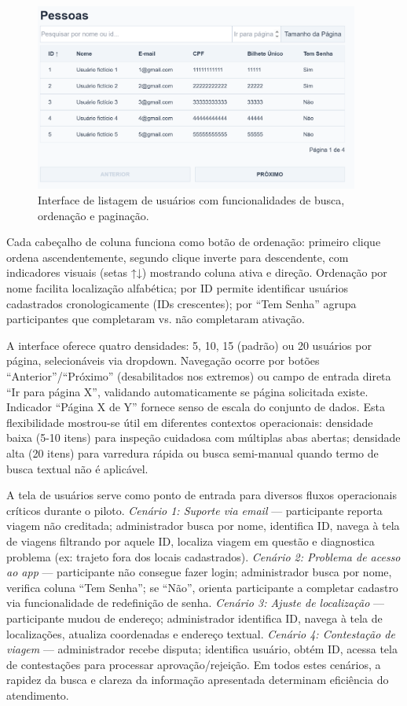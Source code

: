 \begin{figure}[H]
    \centering
    \includegraphics[width=0.95\textwidth]{figuras/pessoas.PNG}
    \caption{Interface de listagem de usuários com funcionalidades de busca, ordenação e paginação.}
    \label{fig:usuarios_listagem}
  \end{figure}

Cada cabeçalho de coluna funciona como botão de
ordenação: primeiro clique ordena ascendentemente, segundo clique inverte para
descendente, com indicadores visuais (setas ↑↓) mostrando coluna ativa e direção.
Ordenação por nome facilita localização alfabética; por ID permite identificar
usuários cadastrados cronologicamente (IDs crescentes); por ``Tem Senha'' agrupa
participantes que completaram vs. não completaram ativação.

A interface oferece quatro densidades: 5, 10, 15
(padrão) ou 20 usuários por página, selecionáveis via dropdown. Navegação ocorre por
botões ``Anterior''/``Próximo'' (desabilitados nos extremos) ou campo de entrada
direta ``Ir para página X'', validando automaticamente se página solicitada existe.
Indicador ``Página X de Y'' fornece senso de escala do conjunto de dados. Esta
flexibilidade mostrou-se útil em diferentes contextos operacionais: densidade baixa
(5-10 itens) para inspeção cuidadosa com múltiplas abas abertas; densidade alta
(20 itens) para varredura rápida ou busca semi-manual quando termo de busca textual
não é aplicável.

A tela de usuários serve como ponto de
entrada para diversos fluxos operacionais críticos durante o piloto. \textit{Cenário
1: Suporte via email} --- participante reporta viagem não creditada; administrador
busca por nome, identifica ID, navega à tela de viagens filtrando por aquele ID,
localiza viagem em questão e diagnostica problema (ex: trajeto fora dos locais
cadastrados). \textit{Cenário 2: Problema de acesso ao app} --- participante não
consegue fazer login; administrador busca por nome, verifica coluna ``Tem Senha''; se
``Não'', orienta participante a completar cadastro via funcionalidade de redefinição
de senha. \textit{Cenário 3: Ajuste de localização} --- participante mudou de
endereço; administrador identifica ID, navega à tela de localizações, atualiza
coordenadas e endereço textual. \textit{Cenário 4: Contestação de viagem} ---
administrador recebe disputa; identifica usuário, obtém ID, acessa tela de
contestações para processar aprovação/rejeição. Em todos estes cenários, a rapidez
da busca e clareza da informação apresentada determinam eficiência do atendimento.


